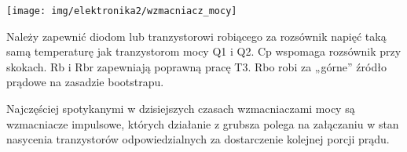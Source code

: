 \documentclass{pdfBooklets}
\begin{document}
\begin{center}\texttt{[image: img/elektronika2/wzmacniacz\_mocy]}\end{center}

Należy zapewnić diodom lub tranzystorowi robiącego za rozsównik napięć taką samą temperaturę jak tranzystorom mocy Q1 i Q2.
Cp wspomaga rozsównik przy skokach.
Rb i Rbr zapewniają poprawną pracę T3.
Rbo robi za „górne” źródło prądowe na zasadzie bootstrapu.

Najczęściej spotykanymi w dzisiejszych czasach wzmacniaczami mocy są wzmacniacze impulsowe, których działanie z grubsza polega na załączaniu w stan nasycenia tranzystorów odpowiedzialnych za dostarczenie kolejnej porcji prądu.

\end{document}
